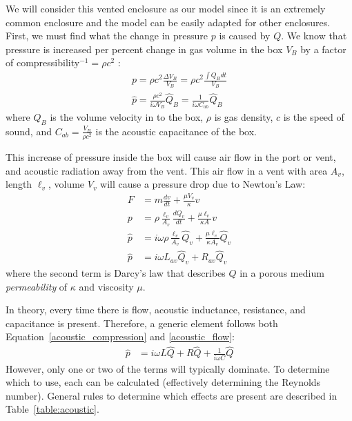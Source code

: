 \documentclass[10pt,letterpaper]{book}
\begin{document}
We will consider this vented enclosure as our model since it is an extremely common enclosure  and the model can be easily adapted for other enclosures. First, we must find what the change in pressure $p$ is caused by $Q$. We know that pressure is increased per percent change in gas volume in the box $V_B$ by a factor of compressibility$^{-1}=\rho c^2$ :
\begin{align}
p=\rho c^2 \frac{\Delta V_B}{V_B}=\rho c^2 \frac{\int Q_B dt}{V_B}\\
\hat{p}=\frac{\rho c^2}{i\omega V_B}\hat{Q}_B=\frac{1}{i\omega C_{ab}}\hat{Q}_B\label{acoustic_compression}
\end{align}
where $Q_B$ is the volume velocity in to the box, $\rho$ is gas density, $c$ is the speed of sound, and $C_{ab}=\frac{V_B}{\rho c^2}$ is the acoustic capacitance of the box.

This increase of pressure inside the box will cause air flow in 
the port or vent, and acoustic radiation away from the vent. This air flow in a vent with area $A_v$, length $\ell_v$, volume $V_v$ will cause a pressure drop due to Newton's Law:
\begin{align}
F&=m\frac{dv}{dt}+\frac{\mu V_v}{\kappa} v\\
p&=\rho \frac{\ell_v}{A_v}\frac{dQ_v}{dt}+\frac{\mu \ell_v}{\kappa A} v\\
\hat{p}&=i\omega\rho \frac{\ell_v}{A_v}\hat{Q}_v+\frac{\mu \ell_v}{\kappa A_v} \hat{Q}_v\\
\hat{p}&=i\omega L_{av} \hat{Q}_v+R_{av} \hat{Q}_v \label{acoustic_flow}
\end{align}
where the second term is Darcy's law that describes $Q$ in a porous medium \textit{permeability} of $\kappa$ and viscosity $\mu$.

In theory, every time there is flow, acoustic inductance, resistance, and capacitance is present. Therefore, a generic element follows both Equation~\ref{acoustic_compression} and \ref{acoustic_flow}:
\begin{align}
\hat{p}&=i\omega L \hat{Q}+R \hat{Q} +\frac{1}{i\omega C}\hat{Q}
\end{align}
However, only one or two of the terms will typically dominate. To determine which to use, each can be calculated (effectively determining the Reynolds number). General rules to determine which effects are present are described in Table~\ref{table:acoustic}.
\end{document}

